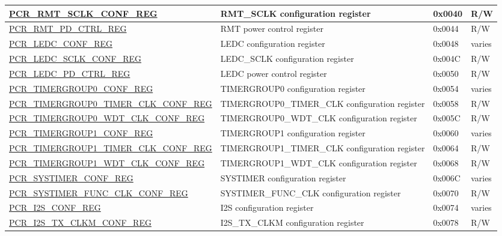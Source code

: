 \begin{longtable}{ | p{7cm} | p{6.2cm} | p{1.3cm} | p{1.5cm} | }
\hyperref[regdesc:PCRRMTSCLKCONFREG]{PCR\_RMT\_SCLK\_CONF\_REG} & RMT\_SCLK configuration register & 0x0040 & R/W \\ \hline
\hyperref[regdesc:PCRRMTPDCTRLREG]{PCR\_RMT\_PD\_CTRL\_REG} & RMT power control register & 0x0044 & R/W \\ \hline
\hyperref[regdesc:PCRLEDCCONFREG]{PCR\_LEDC\_CONF\_REG} & LEDC configuration register & 0x0048 & varies \\ \hline
\hyperref[regdesc:PCRLEDCSCLKCONFREG]{PCR\_LEDC\_SCLK\_CONF\_REG} & LEDC\_SCLK configuration register & 0x004C & R/W \\ \hline
\hyperref[regdesc:PCRLEDCPDCTRLREG]{PCR\_LEDC\_PD\_CTRL\_REG} & LEDC power control register & 0x0050 & R/W \\ \hline
\hyperref[regdesc:PCRTIMERGROUP0CONFREG]{PCR\_TIMERGROUP0\_CONF\_REG} & TIMERGROUP0 configuration register & 0x0054 & varies \\ \hline
\hyperref[regdesc:PCRTIMERGROUP0TIMERCLKCONFREG]{PCR\_TIMERGROUP0\_TIMER\_CLK\_CONF\_REG} & TIMERGROUP0\_TIMER\_CLK configuration register & 0x0058 & R/W \\ \hline
\hyperref[regdesc:PCRTIMERGROUP0WDTCLKCONFREG]{PCR\_TIMERGROUP0\_WDT\_CLK\_CONF\_REG} & TIMERGROUP0\_WDT\_CLK configuration register & 0x005C & R/W \\ \hline
\hyperref[regdesc:PCRTIMERGROUP1CONFREG]{PCR\_TIMERGROUP1\_CONF\_REG} & TIMERGROUP1 configuration register & 0x0060 & varies \\ \hline
\hyperref[regdesc:PCRTIMERGROUP1TIMERCLKCONFREG]{PCR\_TIMERGROUP1\_TIMER\_CLK\_CONF\_REG} & TIMERGROUP1\_TIMER\_CLK configuration register & 0x0064 & R/W \\ \hline
\hyperref[regdesc:PCRTIMERGROUP1WDTCLKCONFREG]{PCR\_TIMERGROUP1\_WDT\_CLK\_CONF\_REG} & TIMERGROUP1\_WDT\_CLK configuration register & 0x0068 & R/W \\ \hline
\hyperref[regdesc:PCRSYSTIMERCONFREG]{PCR\_SYSTIMER\_CONF\_REG} & SYSTIMER configuration register & 0x006C & varies \\ \hline
\hyperref[regdesc:PCRSYSTIMERFUNCCLKCONFREG]{PCR\_SYSTIMER\_FUNC\_CLK\_CONF\_REG} & SYSTIMER\_FUNC\_CLK configuration register & 0x0070 & R/W \\ \hline
\hyperref[regdesc:PCRI2SCONFREG]{PCR\_I2S\_CONF\_REG} & I2S configuration register & 0x0074 & varies \\ \hline
\hyperref[regdesc:PCRI2STXCLKMCONFREG]{PCR\_I2S\_TX\_CLKM\_CONF\_REG} & I2S\_TX\_CLKM configuration register & 0x0078 & R/W \\ \hline

\end{longtable}
